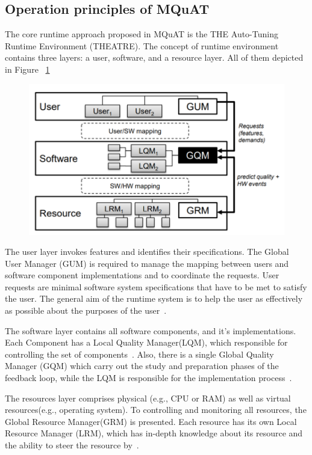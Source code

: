 \subsection{Operation principles of MQuAT}
The core runtime approach proposed in MQuAT is the THE Auto-Tuning Runtime Environment (THEATRE)\cite{gotz10, gotz12}.
The concept of runtime environment contains three layers: a user, software, and a resource layer. All of them depicted in Figure ~\ref{fig:threelayersmquat}
\begin{figure}
	\centering
	\includegraphics[width=\textwidth]{images/ThreeLayersMQuAT}
	\caption[Layers of MQuAT]{}
	\label{fig:threelayersmquat}
\end{figure}

The user layer invokes features and identifies their specifications. The  Global  User  Manager  (GUM)  is required to manage the mapping between users and software component implementations and to coordinate the requests. User requests are minimal software system specifications that have to be met to satisfy the user. The general aim of the runtime system is to help the user as effectively as possible about the purposes of the user~\cite{gotz13}.

The software layer contains all software components, and it's implementations. Each Component has a Local Quality Manager(LQM), which responsible for controlling the set of components~\cite{gotz13, ahmad18}. Also, there is a single Global Quality Manager (GQM) which carry out the study and preparation phases of the feedback loop, while the LQM is responsible for the implementation process~\cite{gotz13}.

The resources layer comprises physical (e.g., CPU or RAM) as well as virtual resources(e.g., operating system).
To controlling and monitoring all resources, the Global Resource Manager(GRM) is presented. Each resource has its own Local Resource Manager (LRM), which has in-depth knowledge about its resource and the ability to steer the resource by~\cite{gotz13, ahmad18}.

